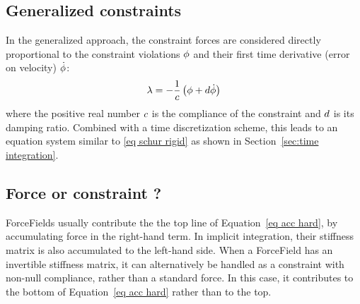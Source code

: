 \subsection{Generalized constraints}
In the generalized approach, the constraint forces are considered directly proportional to the constraint violations $\phi$ and their first time derivative (error on velocity) $\dot {\phi}$:
\begin{equation}\label{eq generalized constraint}
\mathbf{\lambda} = - \frac{1}{c} \left( \phi + d \dot {\phi} \right)
\end{equation}
where the positive real number $c$ is the compliance of the constraint and $d$ is its damping ratio.
Combined with a time discretization scheme, this leads to an equation system similar to \eqref{eq schur rigid} as shown in Section~\ref{sec:time integration}.

\subsection{Force or constraint ?} \label{sec force or constraint}
ForceFields usually contribute the the top line of Equation~\ref{eq acc hard}, by accumulating force in the right-hand term. In implicit integration, their stiffness matrix is also accumulated to the left-hand side.
When a ForceField has an invertible stiffness matrix, it can alternatively be handled as a constraint with non-null compliance, rather than a standard force. In this case, it contributes to the bottom of Equation~\ref{eq acc hard} rather than to the top.

